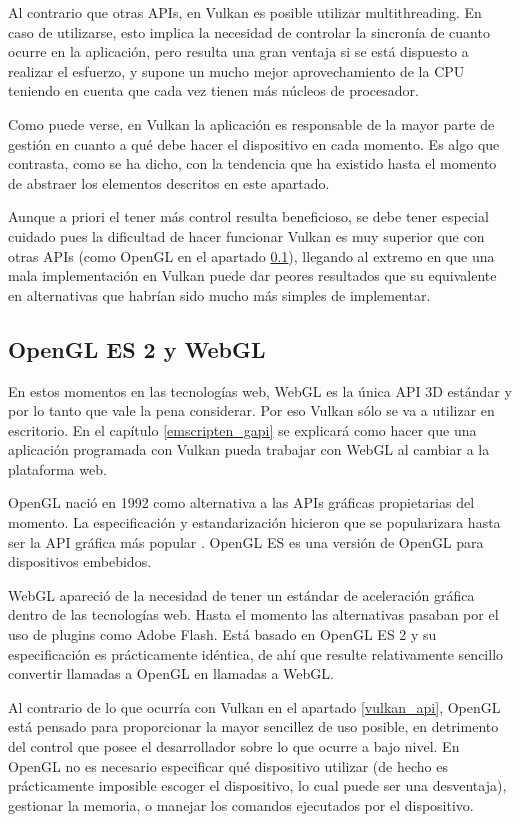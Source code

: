Al contrario que otras APIs, en Vulkan es posible utilizar multithreading. En caso de utilizarse, esto implica la necesidad de controlar la sincronía de cuanto ocurre en la aplicación, pero resulta una gran ventaja si se está dispuesto a realizar el esfuerzo, y supone un mucho mejor aprovechamiento de la CPU teniendo en cuenta que cada vez tienen más núcleos de procesador.

Como puede verse, en Vulkan la aplicación es responsable de la mayor parte de gestión en cuanto a qué debe hacer el dispositivo en cada momento. Es algo que contrasta, como se ha dicho, con la tendencia que ha existido hasta el momento de abstraer los elementos descritos en este apartado. 

Aunque a priori el tener más control resulta beneficioso, se debe tener especial cuidado pues la dificultad de hacer funcionar Vulkan es muy superior que con otras APIs (como OpenGL en el apartado \ref{opengl_webgl_api}), llegando al extremo en que una mala implementación en Vulkan puede dar peores resultados que su equivalente en alternativas que habrían sido mucho más simples de implementar.

\subsection{OpenGL ES 2 y WebGL}
\label{opengl_webgl_api}
En estos momentos en las tecnologías web, WebGL es la única API 3D estándar y por lo tanto que vale la pena considerar. Por eso Vulkan sólo se va a utilizar en escritorio. En el capítulo \ref{emscripten_gapi} se explicará como hacer que una aplicación programada con Vulkan pueda trabajar con WebGL al cambiar a la plataforma web.

OpenGL nació en 1992 como alternativa a las APIs gráficas propietarias del momento. La especificación y estandarización hicieron que se popularizara hasta ser la API gráfica más popular . OpenGL ES es una versión de OpenGL para dispositivos embebidos.

WebGL apareció de la necesidad de tener un estándar de aceleración gráfica dentro de las tecnologías web. Hasta el momento las alternativas pasaban por el uso de plugins como Adobe Flash. Está basado en OpenGL ES 2 y su especificación es prácticamente idéntica, de ahí que resulte relativamente sencillo convertir llamadas a OpenGL en llamadas a WebGL.

Al contrario de lo que ocurría con Vulkan en el apartado \ref{vulkan_api}, OpenGL está pensado para proporcionar la mayor sencillez de uso posible, en detrimento del control que posee el desarrollador sobre lo que ocurre a bajo nivel. En OpenGL no es necesario especificar qué dispositivo utilizar (de hecho es prácticamente imposible escoger el dispositivo, lo cual puede ser una desventaja), gestionar la memoria, o manejar los comandos ejecutados por el dispositivo.

